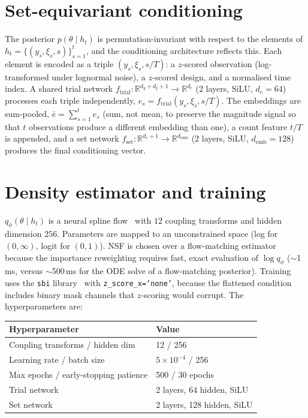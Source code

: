 \section{Set-equivariant conditioning}
The posterior $p(\theta\mid h_t)$ is permutation-invariant with respect to the elements
of $h_t=\{(y_s,\xi_s,s)\}_{s=1}^{t}$, and the conditioning architecture reflects this.
Each element is encoded as a triple $(y_s,\xi_s,s/T)$: a $z$-scored observation
(log-transformed under lognormal noise), a $z$-scored design, and a normalised time
index. A shared trial network $f_{\mathrm{trial}}:\mathbb{R}^{d_y+d_\xi+1}\to\mathbb{R}^{d_e}$
(2 layers, SiLU, $d_e=64$) processes each triple independently,
$e_s=f_{\mathrm{trial}}(y_s,\xi_s,s/T)$. The embeddings are sum-pooled,
$\bar e=\sum_{s=1}^{t}e_s$ (sum, not mean, to preserve the magnitude signal so that $t$
observations produce a different embedding than one), a count feature $t/T$ is appended,
and a set network $f_{\mathrm{set}}:\mathbb{R}^{d_e+1}\to\mathbb{R}^{d_{\mathrm{emb}}}$
(2 layers, SiLU, $d_{\mathrm{emb}}=128$) produces the final conditioning vector.

\section{Density estimator and training}
$q_\phi(\theta\mid h_t)$ is a neural spline flow~\citep{durkan2019neural} with $12$
coupling transforms and hidden dimension $256$. Parameters are mapped to an
unconstrained space (log for $(0,\infty)$, logit for $(0,1)$). NSF is chosen over a
flow-matching estimator because the importance reweighting requires fast, exact
evaluation of $\log q_\phi$ ($\sim$1\,ms, versus $\sim$500\,ms for the ODE solve of a
flow-matching posterior). Training uses the \texttt{sbi} library~\citep{tejerocantero2020sbi}
with \texttt{z\_score\_x=`none'}, because the flattened condition includes binary mask
channels that $z$-scoring would corrupt. The hyperparameters are:
\begin{center}\small
\begin{tabular}{ll}
\toprule
Hyperparameter & Value \\
\midrule
Coupling transforms / hidden dim & 12 / 256 \\
Learning rate / batch size & $5\times10^{-4}$ / 256 \\
Max epochs / early-stopping patience & 500 / 30 epochs \\
Trial network & 2 layers, 64 hidden, SiLU \\
Set network & 2 layers, 128 hidden, SiLU \\
\bottomrule
\end{tabular}
\end{center}
